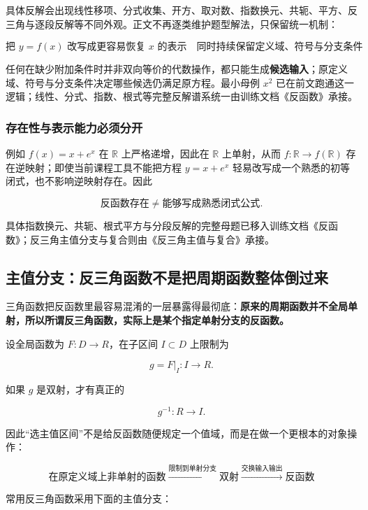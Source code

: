\documentclass[11pt,a4paper]{ctexart}
\begin{document}
具体反解会出现线性移项、分式收集、开方、取对数、指数换元、共轭、平方、反三角与逐段反解等不同外观。正文不再逐类维护题型解法，只保留统一机制：

\[
\boxed{
\text{把 }y=f(x)\text{ 改写成更容易恢复 }x\text{ 的表示}
\quad\text{同时持续保留定义域、符号与分支条件}
}
\]

任何在缺少附加条件时并非双向等价的代数操作，都只能生成\textbf{候选输入}；原定义域、符号与分支条件决定哪些候选仍满足原方程。最小母例 $x^2$ 已在前文跑通这一逻辑；线性、分式、指数、根式等完整反解谱系统一由训练文档《反函数》承接。

\subsubsection{存在性与表示能力必须分开}

例如 $f(x)=x+e^x$ 在 $\mathbb R$ 上严格递增，因此在 $\mathbb R$ 上单射，从而 $f:\mathbb R\to f(\mathbb R)$ 存在逆映射；即使当前课程工具不能把方程 $y=x+e^x$ 轻易改写成一个熟悉的初等闭式，也不影响逆映射存在。因此

\[
\boxed{\text{反函数存在}\neq\text{能够写成熟悉闭式公式}.}
\]

具体指数换元、共轭、根式平方与分段反解的完整母题已移入训练文档《反函数》；反三角主值分支与复合则由《反三角主值与复合》承接。

\subsection{主值分支：反三角函数不是把周期函数整体倒过来}

三角函数把反函数里最容易混淆的一层暴露得最彻底：\textbf{原来的周期函数并不全局单射，所以所谓反三角函数，实际上是某个指定单射分支的反函数。}

设全局函数为 \(F:D\to R\)，在子区间 \(I\subset D\) 上限制为

\[
g=F\vert_I:I\to R.
\]

如果 \(g\) 是双射，才有真正的

\[
g^{-1}:R\to I.
\]

因此“选主值区间”不是给反函数随便规定一个值域，而是在做一个更根本的对象操作：

\[
\boxed{
\text{在原定义域上非单射的函数}
\xrightarrow{\text{限制到单射分支}}
\text{双射}
\xrightarrow{\text{交换输入输出}}
\text{反函数}
}
\]

常用反三角函数采用下面的主值分支：
\end{document}
